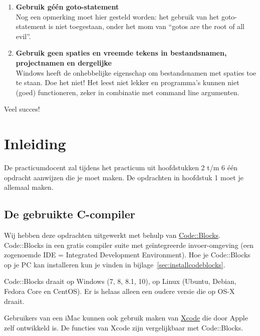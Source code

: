 \documentclass[a4paper,10pt,fleqn,twoside]{article}
\begin{document}
\begin{enumerate}[label=\textbf{\arabic*.}]
Als je niet begrijpt waar het programma fout gaat, steek dan niet direct je hand omhoog. Zet in je code op de plek waar het programma vermoedelijk nog correct werkt een \textsl{breakpoint}\footnote{In de les wordt uitgelegd hoe je dit moet doen.}. Als het programma tijdens het debuggen is gestopt op de plek van de breakpoint, controleer dan goed de inhoud van alle actuele variabelen. Dit is één van de krachtigste manieren om fouten te detecteren en om tot een werkend programma te komen.
\item \textbf{Gebruik géén goto-statement}\\
Nog een opmerking moet hier gesteld worden: het gebruik van het goto-statement is niet toegestaan, onder het mom van ``gotos are the root of all evil''.
\item \textbf{Gebruik geen spaties en vreemde tekens in bestandsnamen, projectnamen en dergelijke}\\
Windows heeft de onhebbelijke eigenschap om bestandsnamen met spaties toe te staan. Doe het niet! Het leest niet lekker en programma’s kunnen niet (goed) functioneren, zeker in combinatie met command line argumenten.
\end{enumerate}


Veel succes!



\section{Inleiding}

De practicumdocent zal tijdens het practicum uit hoofdstukken 2 t/m 6 één opdracht aanwijzen die je moet maken. De opdrachten in hoofdstuk 1 moet je allemaal maken. 

\subsection{De gebruikte C-compiler}
Wij hebben deze opdrachten uitgewerkt met behulp van \href{http://www.codeblocks.org/}{Code::Blocks}. Code::Blocks in een gratis compiler suite met geïntegreerde invoer-omgeving (een zogenoemde IDE = Integrated Development Environment). Hoe je Code::Blocks op je PC kan installeren kun je vinden in bijlage~\ref{sec:installcodeblocks}.

Code::Blocks draait op Windows (7, 8, 8.1, 10), op Linux (Ubuntu, Debian, Fedora Core en CentOS). Er is helaas alleen een oudere versie die op OS-X draait.

Gebruikers van een iMac kunnen ook gebruik maken van \href{https://developer.apple.com/xcode/}{Xcode} die door Apple zelf ontwikkeld is. De functies van Xcode zijn vergelijkbaar met Code::Blocks.
\end{document}
